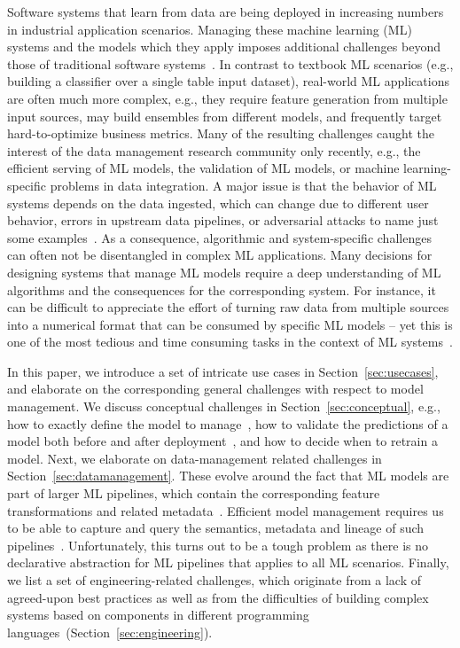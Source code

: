 \documentclass[11pt]{article}
\begin{document}
Software systems that learn from data are being deployed in increasing numbers in industrial application scenarios. Managing these machine learning (ML) systems and the models which they apply imposes additional challenges beyond those of traditional software systems~\cite{Kumar2015,Polyzotis2017,Crankshaw2017}. In contrast to textbook ML scenarios (e.g., building a classifier over a single table input dataset), real-world ML applications are often much more complex, e.g., they require feature generation from multiple input sources, may build ensembles from different models, and frequently target hard-to-optimize business metrics. Many of the resulting challenges caught the interest of the data management research community only recently, e.g., the efficient serving of ML models, the validation of ML models, or machine learning-specific problems in data integration. A major issue is that the behavior of ML systems depends on the data ingested, which can change due to different user behavior, errors in upstream data pipelines, or adversarial attacks to name just some examples~\cite{Baylor2017}. As a consequence, algorithmic and system-specific challenges can often not be disentangled in complex ML applications. Many decisions for designing systems that manage ML models require a deep understanding of ML algorithms and the consequences for the corresponding system. For instance, it can be difficult to appreciate the effort of turning raw data from multiple sources into a numerical format that can be consumed by specific ML models -- yet this is one of the most tedious and time consuming tasks in the context of ML systems~\cite{Stonebraker2018}.

In this paper, we introduce a set of intricate use cases in Section~\ref{sec:usecases}, and elaborate on the corresponding general challenges with respect to model management. We discuss conceptual challenges in Section~\ref{sec:conceptual}, e.g., how to exactly define the model to manage~\cite{Vanschoren2014}, how to validate the predictions of a model both before and after deployment~\cite{Baylor2017}, and how to decide when to retrain a model. Next, we elaborate on data-management related challenges in Section~\ref{sec:datamanagement}. These evolve around the fact that ML models are part of larger ML pipelines, which contain the corresponding feature transformations and related metadata~\cite{Sparks2017,VanDerWeide2017}. Efficient model management requires us to be able to capture and query the semantics, metadata and lineage of such pipelines~\cite{Vartak2016,Schelter2017,Vartak2018}. Unfortunately, this turns out to be a tough problem as there is no declarative abstraction for ML pipelines that applies to all ML scenarios. Finally, we list a set of engineering-related challenges, which originate from a lack of agreed-upon best practices as well as from the difficulties of building complex systems based on components in different programming languages~(Section~\ref{sec:engineering}).
\end{document}
